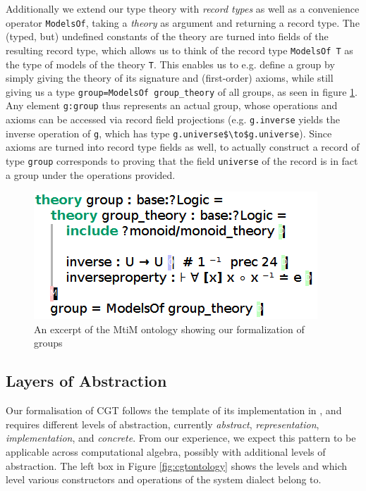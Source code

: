 Additionally we extend our type theory with \emph{record types} as well as a convenience operator \lstinline|ModelsOf|, taking a \emph{theory} as argument and returning a record type. The (typed, but) undefined constants of the theory are turned into fields of the resulting record type, which allows us to think of the record type \lstinline|ModelsOf T| as the type of models of the theory \lstinline|T|. This enables us to e.g. define a group by simply giving the theory of its signature and (first-order) axioms, while still giving us a type \lstinline|group=ModelsOf group_theory| of all groups, as seen in figure \ref{fig:mitm1}. Any element \lstinline|g:group| thus represents an actual group, whose operations and axioms can be accessed via record field projections (e.g. \lstinline|g.inverse| yields the inverse operation of \lstinline|g|, which has type \lstinline[mathescape]|g.universe$\to$g.universe|). Since axioms are turned into record type fields as well, to actually construct a record of type \lstinline|group| corresponds to proving that the field \lstinline|universe| of the record is in fact a group under the operations provided.

\begin{figure}[ht]\centering
  \includegraphics[width=.5\textwidth]{mitm1}
  \caption{An excerpt of the MtiM ontology showing our formalization of groups}\label{fig:mitm1}
\end{figure}

\subsection{Layers of Abstraction}

Our formalisation of CGT follows the template of its implementation in \GAP, and requires
different levels of abstraction, currently \emph{abstract}, \emph{representation},
\emph{implementation}, and \emph{concrete}.  From our experience, we expect this pattern
to be applicable across computational algebra, possibly with additional levels of
abstraction. The left box in Figure \ref{fig:cgtontology} shows the levels and which level
various constructors and operations of the \GAP system dialect belong to.

